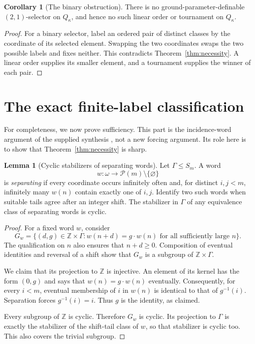 \documentclass[11pt,letterpaper]{article}
\theoremstyle{definition}
\newtheorem{lemma}[definition]{Lemma}
\newtheorem{corollary}[definition]{Corollary}
\numberwithin{equation}{section}
\newcommand{\Pow}{\mathcal P}
\begin{document}
\begin{corollary}[The binary obstruction]\label{cor:binary}
There is no ground-parameter-definable $(2,1)$-selector on $Q_\kappa$, and hence no such linear order or tournament on $Q_\kappa$.
\end{corollary}
\begin{proof}
For a binary selector, label an ordered pair of distinct classes by the coordinate of its selected element. Swapping the two coordinates swaps the two possible labels and fixes neither. This contradicts Theorem~\ref{thm:necessity}. A linear order supplies its smaller element, and a tournament supplies the winner of each pair.
\end{proof}

\section{The exact finite-label classification}\label{sec:classification}

For completeness, we now prove sufficiency. This part is the incidence-word argument of the supplied synthesis \cite[Section~12, theorem labelled \texttt{thm:classification}]{synthesis}, not a new forcing argument. Its role here is to show that Theorem~\ref{thm:necessity} is sharp.

\begin{lemma}[Cyclic stabilizers of separating words]\label{lem:cyclic}
Let $\Gamma\le S_m$. A word
\[
w:\omega\longrightarrow\Pow(m)\setminus\{\varnothing\}
\]
is \emph{separating} if every coordinate occurs infinitely often and, for distinct $i,j<m$, infinitely many $w(n)$ contain exactly one of $i,j$. Identify two such words when suitable tails agree after an integer shift. The stabilizer in $\Gamma$ of any equivalence class of separating words is cyclic.
\end{lemma}
\begin{proof}
For a fixed word $w$, consider
\[
G_w=\{(d,g)\in\mathbb Z\times\Gamma:
      w(n+d)=g\cdot w(n)\text{ for all sufficiently large }n\}.
\]
The qualification on $n$ also ensures that $n+d\ge0$. Composition of eventual identities and reversal of a shift show that $G_w$ is a subgroup of $\mathbb Z\times\Gamma$.

We claim that its projection to $\mathbb Z$ is injective. An element of its kernel has the form $(0,g)$ and says that $w(n)=g\cdot w(n)$ eventually. Consequently, for every $i<m$, eventual membership of $i$ in $w(n)$ is identical to that of $g^{-1}(i)$. Separation forces $g^{-1}(i)=i$. Thus $g$ is the identity, as claimed.

Every subgroup of $\mathbb Z$ is cyclic. Therefore $G_w$ is cyclic. Its projection to $\Gamma$ is exactly the stabilizer of the shift-tail class of $w$, so that stabilizer is cyclic too. This also covers the trivial subgroup.
\end{proof}
\end{document}
